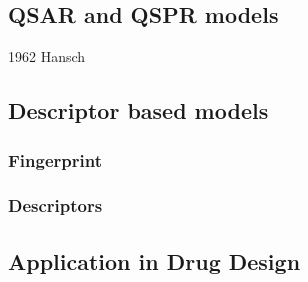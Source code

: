 \subsection{QSAR and QSPR models}
1962 Hansch
\subsection{Descriptor based models}
\subsubsection{Fingerprint}

\subsubsection{Descriptors}

\subsection{Application in Drug Design}